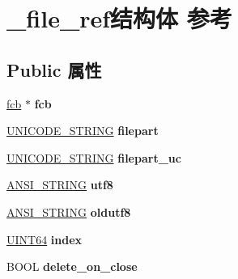 \hypertarget{struct__file__ref}{}\section{\+\_\+file\+\_\+ref结构体 参考}
\label{struct__file__ref}
\subsection*{Public 属性}
\begin{DoxyCompactItemize}
\item 
\mbox{\label{struct__file__ref_a38ff2858affa408adfced7cb76affbf9}} 
\hyperlink{struct__fcb}{fcb} $\ast$ {\bfseries fcb}
\item 
\mbox{\label{struct__file__ref_aabc6c03eb1cfb3e7cc7efc672186951f}} 
\hyperlink{struct___u_n_i_c_o_d_e___s_t_r_i_n_g}{U\+N\+I\+C\+O\+D\+E\+\_\+\+S\+T\+R\+I\+NG} {\bfseries filepart}
\item 
\mbox{\label{struct__file__ref_a1ca19c006d9d84477619bd22a312eaee}} 
\hyperlink{struct___u_n_i_c_o_d_e___s_t_r_i_n_g}{U\+N\+I\+C\+O\+D\+E\+\_\+\+S\+T\+R\+I\+NG} {\bfseries filepart\+\_\+uc}
\item 
\mbox{\label{struct__file__ref_ad1a830cdcc3d7e51d1a5dad8c7ce1fdc}} 
\hyperlink{struct___a_n_s_i___s_t_r_i_n_g}{A\+N\+S\+I\+\_\+\+S\+T\+R\+I\+NG} {\bfseries utf8}
\item 
\mbox{\label{struct__file__ref_ad885e1df2161cc319e1f4e4195720078}} 
\hyperlink{struct___a_n_s_i___s_t_r_i_n_g}{A\+N\+S\+I\+\_\+\+S\+T\+R\+I\+NG} {\bfseries oldutf8}
\item 
\mbox{\label{struct__file__ref_acfca06dc20e8770e8b55ad3d7e515dd2}} 
\hyperlink{_processor_bind_8h_a57be03562867144161c1bfee95ca8f7c}{U\+I\+N\+T64} {\bfseries index}
\item 
\mbox{\label{struct__file__ref_a6eb8860d4123ea04e101e1e4c00f40b6}} 
B\+O\+OL {\bfseries delete\+\_\+on\+\_\+close}
\item 
\mbox{\label{struct__file__ref_a4d9580c2d3531e75a8b9958e086e7a7e}} 

\end{DoxyCompactItemize}
